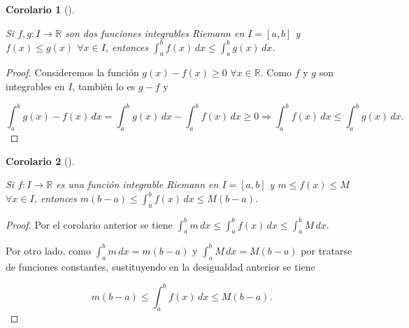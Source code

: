 \documentclass[
  a4paper,
]{scrreport}
\theoremstyle{definition}
\theoremstyle{plain}
\newtheorem{corollary}{Corolario}[chapter]
\theoremstyle{definition}
\theoremstyle{definition}
\theoremstyle{plain}
\theoremstyle{plain}
\theoremstyle{remark}
\begin{document}
\begin{corollary}[]\protect\hypertarget{cor-integral-funcion-mayor-que-otra}{}\label{cor-integral-funcion-mayor-que-otra}

Si \(f,g:I\to\mathbb{R}\) son dos funciones integrables Riemann en
\(I=[a,b]\) y \(f(x)\leq g(x)\) \(\forall x\in I\), entonces
\(\int_a^b f(x)\,dx \leq \int_a^b g(x)\,dx\).

\end{corollary}

\begin{tcolorbox}[enhanced jigsaw, leftrule=.75mm, colbacktitle=quarto-callout-note-color!10!white, toprule=.15mm, opacityback=0, opacitybacktitle=0.6, toptitle=1mm, breakable, bottomtitle=1mm, colframe=quarto-callout-note-color-frame, rightrule=.15mm, titlerule=0mm, title=\textcolor{quarto-callout-note-color}{\faInfo}\hspace{0.5em}{Demostración}, arc=.35mm, left=2mm, bottomrule=.15mm, colback=white, coltitle=black]

\begin{proof}
Consideremos la función \(g(x)-f(x)\geq 0\) \(\forall x\in\mathbb{R}\).
Como \(f\) y \(g\) son integrables en \(I\), también lo es \(g-f\) y

\[
\int_a^b g(x)-f(x)\, dx = \int_a^b g(x)\,dx - \int_a^b f(x)\,dx \geq 0 \Rightarrow \int_a^b f(x)\,dx \leq \int_a^b g(x)\,dx.
\]
\end{proof}

\end{tcolorbox}

\begin{corollary}[]\protect\hypertarget{cor-integral-funcion-acotada}{}\label{cor-integral-funcion-acotada}

Si \(f:I\to\mathbb{R}\) es una función integrable Riemann en \(I=[a,b]\)
y \(m\leq f(x)\leq M\) \(\forall x\in I\), entonces
\(m(b-a)\leq \int_a^b f(x)\,dx \leq M(b-a)\).

\end{corollary}

\begin{tcolorbox}[enhanced jigsaw, leftrule=.75mm, colbacktitle=quarto-callout-note-color!10!white, toprule=.15mm, opacityback=0, opacitybacktitle=0.6, toptitle=1mm, breakable, bottomtitle=1mm, colframe=quarto-callout-note-color-frame, rightrule=.15mm, titlerule=0mm, title=\textcolor{quarto-callout-note-color}{\faInfo}\hspace{0.5em}{Demostración}, arc=.35mm, left=2mm, bottomrule=.15mm, colback=white, coltitle=black]

\begin{proof}
Por el corolario anterior se tiene
\(\int_a^b m\,dx \leq \int_a^b f(x)\,dx \leq \int_a^b M\,dx\).

Por otro lado, como \(\int_a^b m\,dx = m(b-a)\) y
\(\int_a^b M\,dx = M(b-a)\) por tratarse de funciones constantes,
sustituyendo en la desigualdad anterior se tiene

\[
m(b-a)\leq \int_a^b f(x)\,dx \leq M(b-a).
\]
\end{proof}

\end{tcolorbox}
\end{document}
